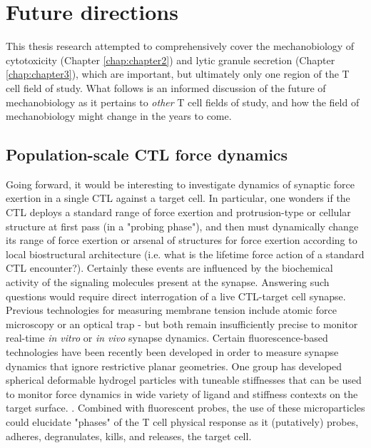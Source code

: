 \section{Future directions}

This thesis research attempted to comprehensively cover the mechanobiology of cytotoxicity (Chapter \ref{chap:chapter2}) and lytic granule secretion (Chapter \ref{chap:chapter3}), which are important, but ultimately only one region of the T cell field of study. What follows is an informed discussion of the future of mechanobiology as it pertains to \textit{other} T cell fields of study, and how the field of mechanobiology might change in the years to come.

\subsection{Population-scale CTL force dynamics}

Going forward, it would be interesting to investigate dynamics of synaptic force exertion in a single CTL against a target cell. In particular, one wonders if the CTL deploys a standard range of force exertion and protrusion-type or cellular structure at first pass (in a "probing phase"), and then must dynamically change its range of force exertion or arsenal of structures for force exertion according to local biostructural architecture (i.e. what is the lifetime force action of a standard CTL encounter?). Certainly these events are influenced by the biochemical activity of the signaling molecules present at the synapse. Answering such questions would require direct interrogation of a live CTL-target cell synapse. Previous technologies for measuring membrane tension include atomic force microscopy or an optical trap - but both remain insufficiently precise to monitor real-time \textit{in vitro} or \textit{in vivo} synapse dynamics. Certain fluorescence-based technologies have been recently been developed in order to measure synapse dynamics that ignore restrictive planar geometries. One group has developed spherical deformable hydrogel particles with tuneable stiffnesses \cite{Vorselen2020} that can be used to monitor force dynamics in wide variety of ligand and stiffness contexts on the target surface. \cite{Vorselen2020}. Combined with fluorescent probes, the use of these microparticles could elucidate "phases" of the T cell physical response as it (putatively) probes, adheres, degranulates, kills, and releases, the target cell.

